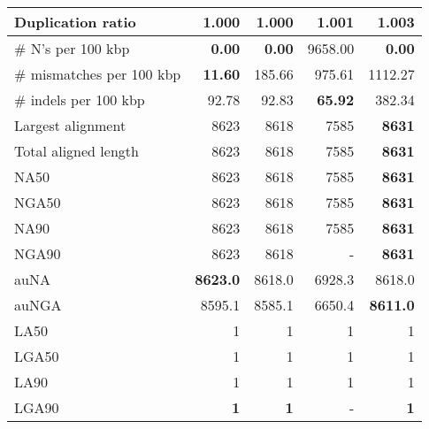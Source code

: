 \documentclass[12pt,a4paper]{article}
\begin{document}
\begin{table}[ht]
\begin{center}
\begin{tabular}{|l*{4}{|r}|}
Duplication ratio & {\bf 1.000} & {\bf 1.000} & 1.001 & 1.003 \\ \hline
\# N's per 100 kbp & {\bf 0.00} & {\bf 0.00} & 9658.00 & {\bf 0.00} \\ \hline
\# mismatches per 100 kbp & {\bf 11.60} & 185.66 & 975.61 & 1112.27 \\ \hline
\# indels per 100 kbp & 92.78 & 92.83 & {\bf 65.92} & 382.34 \\ \hline
Largest alignment & 8623 & 8618 & 7585 & {\bf 8631} \\ \hline
Total aligned length & 8623 & 8618 & 7585 & {\bf 8631} \\ \hline
NA50 & 8623 & 8618 & 7585 & {\bf 8631} \\ \hline
NGA50 & 8623 & 8618 & 7585 & {\bf 8631} \\ \hline
NA90 & 8623 & 8618 & 7585 & {\bf 8631} \\ \hline
NGA90 & 8623 & 8618 & - & {\bf 8631} \\ \hline
auNA & {\bf 8623.0} & 8618.0 & 6928.3 & 8618.0 \\ \hline
auNGA & 8595.1 & 8585.1 & 6650.4 & {\bf 8611.0} \\ \hline
LA50 & 1 & 1 & 1 & 1 \\ \hline
LGA50 & 1 & 1 & 1 & 1 \\ \hline
LA90 & 1 & 1 & 1 & 1 \\ \hline
LGA90 & {\bf 1} & {\bf 1} & - & {\bf 1} \\ \hline
\end{tabular}
\end{center}
\end{table}
\end{document}
